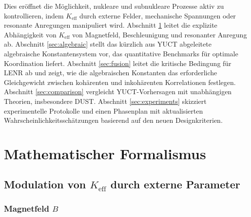 \documentclass[12pt]{article}
\theoremstyle{remark}
\newcommand{\Keff}{K_{\mathrm{eff}}}
\begin{document}
	Dies eröffnet die Möglichkeit, nukleare und subnukleare Prozesse aktiv zu kontrollieren, indem \(\Keff\) durch externe Felder, mechanische Spannungen oder resonante Anregungen manipuliert wird. Abschnitt \ref{sec:math} leitet die explizite Abhängigkeit von \(\Keff\) von Magnetfeld, Beschleunigung und resonanter Anregung ab. Abschnitt \ref{sec:algebraic} stellt das kürzlich aus YUCT abgeleitete algebraische Konstantensystem vor, das quantitative Benchmarks für optimale Koordination liefert. Abschnitt \ref{sec:fusion} leitet die kritische Bedingung für LENR ab und zeigt, wie die algebraischen Konstanten das erforderliche Gleichgewicht zwischen kohärenten und inkohärenten Korrelationen festlegen. Abschnitt \ref{sec:comparison} vergleicht YUCT-Vorhersagen mit unabhängigen Theorien, insbesondere DUST. Abschnitt \ref{sec:experiments} skizziert experimentelle Protokolle und einen Phasenplan mit aktualisierten Wahrscheinlichkeitsschätzungen basierend auf den neuen Designkriterien.
	
	\section{Mathematischer Formalismus}
	\label{sec:math}
	
	\subsection{Modulation von \(\Keff\) durch externe Parameter}
	
	\subsubsection{Magnetfeld \(B\)}
	
\end{document}
